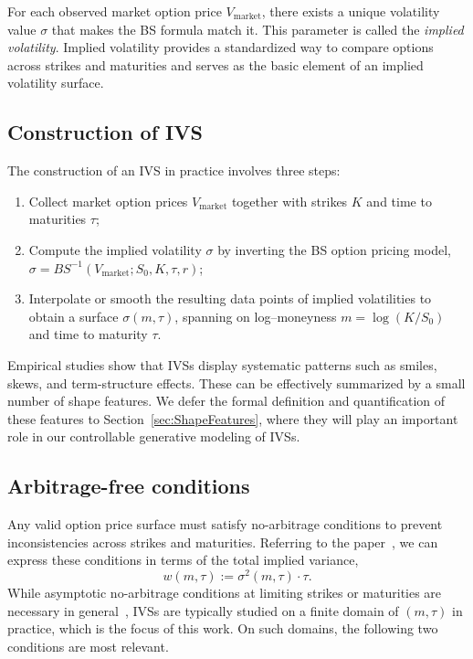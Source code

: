 \documentclass{article}
\begin{document}
For each observed market option price $V_{\text{market}}$, 
 there exists a unique volatility value $\sigma$ that makes the BS formula 
match it. This parameter is called the \emph{implied volatility}. Implied 
volatility provides a standardized way to compare options across strikes and maturities 
and serves as the basic element of an implied volatility surface.

\subsection{Construction of IVS}

The construction of an IVS in practice involves three steps:
\begin{enumerate}
    \item Collect market option prices $V_{\text{market}}$ together with strikes $K$ 
    and time to maturities $\tau$;
    \item Compute the implied volatility $\sigma$ by inverting the BS option pricing model, 
    $\sigma = BS^{-1}(V_{\text{market}}; S_0, K, \tau, r)$;
    \item Interpolate or smooth the resulting data points of implied volatilities to obtain a surface 
    $\sigma(m,\tau)$, spanning on log--moneyness $m=\log(K/S_0)$  
    and time to maturity $\tau$.
\end{enumerate}

Empirical studies show that IVSs display systematic patterns such as smiles, skews, 
and term-structure effects. These can be effectively summarized by a small number of 
shape features. We defer the formal definition and quantification of these features to 
Section~\ref{sec:ShapeFeatures}, where they will play an important role in our controllable generative modeling of IVSs.

\subsection{Arbitrage-free conditions}
\label{sec:arbitrage_free_conditions}

Any valid option price surface must satisfy no-arbitrage conditions to prevent 
inconsistencies across strikes and maturities.  
Referring to the paper~\citep{gatheral2014arbitrage}, we can express these conditions 
in terms of the total implied variance,
\begin{equation}\label{eq:TTV}
    w(m, \tau) := \sigma^2(m, \tau) \cdot \tau.
\end{equation}
While asymptotic no-arbitrage conditions at limiting strikes or maturities are necessary in general~\citep{gatheral2014arbitrage},   IVSs are typically studied on a finite domain of $(m,\tau)$ in practice, which is the focus of this work. On such domains, the following two conditions are most relevant.
\end{document}
